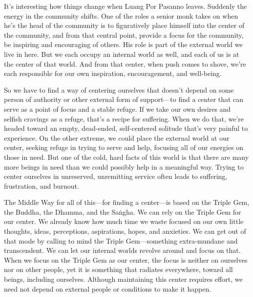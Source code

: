 
It's interesting how things change when Luang Por Pasanno leaves. 
Suddenly the energy in the community shifts. One of the roles a senior 
monk takes on when he's the head of the community is to figuratively 
place himself into the center of the community, and from that central 
point, provide a focus for the community, be inspiring and encouraging 
of others. His role is part of the external world we live in here. But 
we each occupy an internal world as well, and each of us is at the 
center of that world. And from that center, when push comes to shove, 
we're each responsible for our own inspiration, encouragement, and 
well-being.

So we have to find a way of centering ourselves that doesn't depend on 
some person of authority or other external form of support---to find a 
center that can serve as a point of focus and a stable refuge. If we 
take our own desires and selfish cravings as a refuge, that's a recipe 
for suffering. When we do that, we're headed toward an empty, 
dead-ended, self-centered solitude that's very painful to experience. 
On the other extreme, we could place the external world at our center, 
seeking refuge in trying to serve and help, focusing all of our 
energies on those in need. But one of the cold, hard facts of this 
world is that there are many more beings in need than we could possibly 
help in a meaningful way. Trying to center ourselves in unreserved, 
unremitting service often leads to suffering, frustration, and burnout.

The Middle Way for all of this---for finding a center---is based on the 
Triple Gem, the Buddha, the Dhamma, and the Saṅgha. We can rely on 
the Triple Gem for our center. We already know how much time we waste 
focused on our own little thoughts, ideas, perceptions, aspirations, 
hopes, and anxieties. We can get out of that mode by calling to mind 
the Triple Gem---something extra-mundane and transcendent. We can let 
our internal worlds revolve around and focus on that. When we focus on 
the Triple Gem as our center, the focus is neither on ourselves nor on 
other people, yet it is something that radiates everywhere, toward all 
beings, including ourselves. Although maintaining this center requires 
effort, we need not depend on external people or conditions to make it 
happen.


